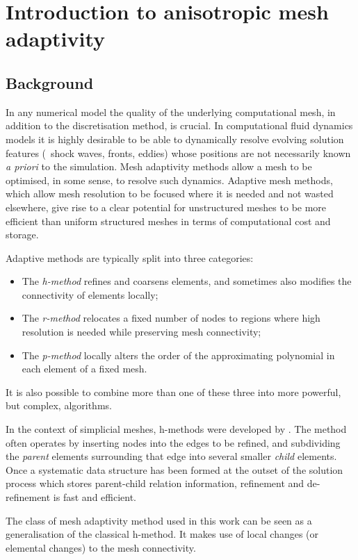 \section{Introduction to anisotropic mesh adaptivity}

\subsection{Background}
In any numerical model the quality of the underlying computational
mesh, in addition to the discretisation method, is crucial. In
computational fluid dynamics models it is highly desirable to be able
to dynamically resolve evolving solution features (\eg\ shock waves,
fronts, eddies) whose positions are not necessarily known {\it a
  priori} to the simulation. Mesh adaptivity methods allow a mesh to
be optimised, in some sense, to resolve such dynamics. Adaptive mesh
methods, which allow mesh resolution to be focused where it is needed
and not wasted elsewhere, give rise to a clear potential for
unstructured meshes to be more efficient than uniform structured
meshes in terms of computational cost and storage.

Adaptive methods are typically split into three categories:
\begin{itemize}
\item The {\it h-method} refines and coarsens elements, and sometimes
  also modifies the connectivity of elements locally;
\item The {\it r-method} relocates a fixed number of nodes to regions
  where high resolution is needed while preserving mesh connectivity;
\item The {\it p-method} locally alters the order of the approximating
  polynomial in each element of a fixed mesh.
\end{itemize}
It is also possible to combine more than one of these three into more
powerful, but complex, algorithms.

In the context of simplicial meshes, h-methods were developed by
\citep{rivara1984a, rivara1984b, lohner1992, ong1994,
  speares1997}. The method often operates by inserting nodes into the
edges to be refined, and subdividing the {\it parent} elements
surrounding that edge into several smaller {\it child} elements. Once
a systematic data structure has been formed at the outset of the
solution process which stores parent-child relation information,
refinement and de-refinement is fast and efficient.

The class of mesh adaptivity method used in this work can be seen
as a generalisation of the classical h-method. It makes use of local
changes (or elemental changes) to the mesh connectivity.

